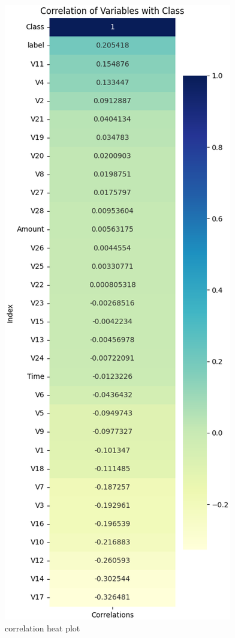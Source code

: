 \begin{figure}[H]
	\centering
	\includegraphics[height=0.5\textheight]{figures/correlation.eps}
	\caption{correlation heat plot}
	\label{fig:correlation}
\end{figure}




